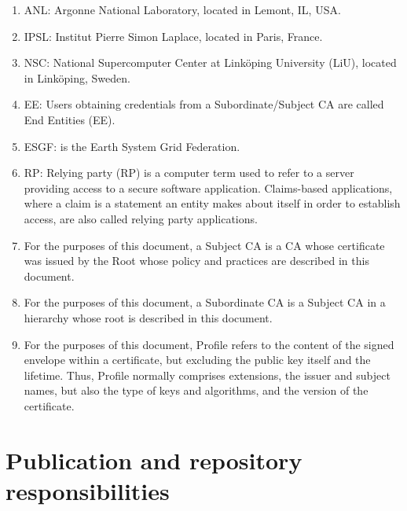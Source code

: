\begin{enumerate}
\item ANL: Argonne National Laboratory, located in Lemont, IL, USA.
\item IPSL: Institut Pierre Simon Laplace, located in Paris, France.
\item NSC: National Supercomputer Center at Link\"oping University (LiU), located in Link\"oping, Sweden.

\item EE: Users obtaining credentials from a Subordinate/Subject CA are called End Entities (EE). 
  
\item
  
  ESGF: is the Earth System Grid Federation.

\item RP:  Relying party (RP) is a computer term used to refer to a server providing access to a secure software application. Claims-based applications, where a claim is a statement an entity makes about itself in order to establish access, are also called relying party applications.
  
\item
  
  For the purposes of this document, a Subject CA is a CA whose
  certificate was issued by the Root whose policy and practices are
  described in this document.
  
\item
  
  For the purposes of this document, a Subordinate CA is a Subject CA in
  a hierarchy whose root is described in this document.
 
\item
  
  For the purposes of this document, Profile refers to the content of
  the signed envelope within a certificate, but excluding the public key
  itself and the lifetime. Thus, Profile normally comprises extensions,
  the issuer and subject names, but also the type of keys and
  algorithms, and the version of the certificate.
  
\end{enumerate}

\section{Publication and repository responsibilities}\label{publication-and-repository-responsibilities}

